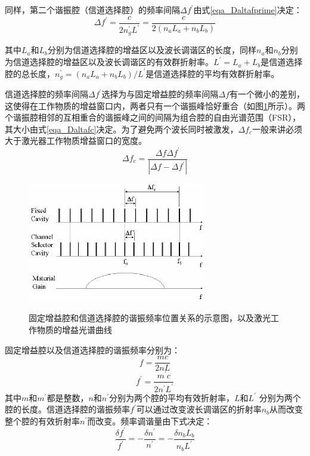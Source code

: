 \documentclass{ZJUthesis}
\begin{document}
同样，第二个谐振腔（信道选择腔）的频率间隔$\Delta f ^\prime$由式\ref{eqa_Daltafprime}决定：
\begin{equation}\label{eqa_Daltafprime}
  \Delta f ^\prime= \frac{c}{2 n_g^\prime L^\prime} = \frac{c}{2 (n_a L_a + n_b L_b)}
\end{equation}

其中$L_a$和$L_b$分别为信道选择腔的增益区以及波长调谐区的长度，同样$n_a$和$n_b$分别为信道选择腔的增益区以及波长调谐区的有效群折射率。$L^\prime=L_a+L_b$是信道选择腔的总长度，$n_g^\prime=(n_a L_a + n_b L_b)/L^\prime$是信道选择腔的平均有效群折射率。

信道选择腔的频率间隔$\Delta f ^\prime$选择为与固定增益腔的频率间隔$\Delta f$有一个微小的差别，这使得在工作物质的增益窗口内，两者只有一个谐振峰恰好重合（如图\ref{fig_Deltaf}所示）。两个谐振腔相邻的互相重合的谐振峰之间的间隔为组合腔的自由光谱范围（FSR），其大小由式\ref{eqa_Daltafc}决定。为了避免两个波长同时被激发，$\Delta f_c$一般来讲必须大于激光器工作物质增益窗口的宽度。
\begin{equation}\label{eqa_Daltafc}
  \Delta f_c = \frac{\Delta f \Delta f^\prime}{|\Delta f-\Delta f^\prime|}
\end{equation}
\begin{figure}[!htb]
  \centering
  \includegraphics[width=0.7\textwidth]{./Pictures/deltaf.eps}\\
  \caption{固定增益腔和信道选择腔的谐振频率位置关系的示意图，以及激光工作物质的增益光谱曲线}
  \label{fig_Deltaf}
\end{figure}

固定增益腔以及信道选择腔的谐振频率分别为：
\begin{equation}
  f = \frac{mc}{2nL}
\end{equation}
\begin{equation}
  f^\prime = \frac{m^\prime c}{2n^\prime L^\prime}
\end{equation}
其中$m$和$m^\prime$都是整数，$n$和$n^\prime$分别为两个腔的平均有效折射率，$L$和$L^\prime$ 分别为两个腔的长度。信道选择腔的谐振频率$f^\prime$可以通过改变波长调谐区的折射率$n_b$从而改变整个腔的有效折射率$n^\prime$而改变。频率调谐量由下式决定：
\begin{equation}
  \frac{\delta f^\prime}{f^\prime} = -\frac{\delta n^\prime}{n^\prime}=-\frac{\delta n_b L_b}{n_b L^\prime}
\end{equation}
\end{document}
